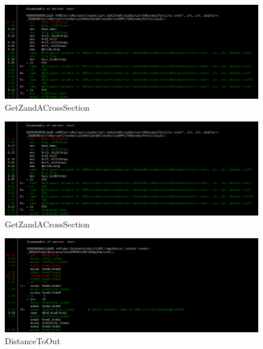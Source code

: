 \documentclass[a4paper]{jpconf}
\begin{document}
\begin{appendices}
\begin{figure}[H]
\begin{center}
\includegraphics[scale=0.33]{images/GetZandACrossSection_P8.png}
\caption{GetZandACrossSection}
\end{center}
\end{figure}

\begin{figure}[H]
\begin{center}
\includegraphics[scale=0.33]{images/GetZandACrossSection_P8.png}
\caption{GetZandACrossSection}
\end{center}
\end{figure}

\begin{figure}[H]
\begin{center}
\includegraphics[scale=0.33]{images/DistanceToOut_P8.png}
\caption{DistanceToOut}
\end{center}
\end{figure}


\end{appendices}
\end{document}
